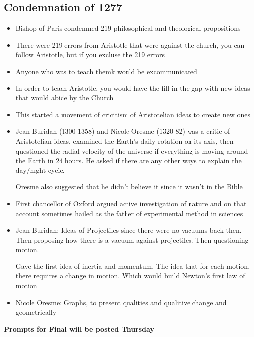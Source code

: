 \documentclass{article}
\begin{document}
\subsection{Condemnation of 1277}
\begin{itemize}
  \item Bishop of Paris condemned 219 philosophical and theological propositions
  \item There were 219 errors from Aristotle that were against the church, you
    can follow Aristotle, but if you excluse the 219 errors
  \item Anyone who was to teach themk would be excommunicated
  \item In order to teach Aristotle, you would have the fill in the gap with
    new ideas that would abide by the Church
  \item This started a movement of cricitism of Aristotelian ideas to create new ones
  \item Jean Buridan (1300-1358) and Nicole Oresme (1320-82) was a critic of Aristotelian ideas, examined
    the Earth's daily rotation on its axis, then questioned the radial velocity of the universe
    if everything is moving around the Earth in 24 hours. He asked if there are any
    other ways to explain the day/night cycle.

    Oresme also suggested that he didn't believe it since it
    wasn't in the Bible
  \item First chancellor of Oxford argued active investigation of nature
    and on that account sometimes hailed as the father of experimental method in sciences
  \item Jean Buridan: Ideas of Projectiles since there were no vacuums back then.
    Then proposing how there is a vacuum against projectiles. Then questioning motion.

    Gave the first idea of inertia and momentum. The idea that for each motion,
    there requires a change in motion. Which would build Newton's first law of motion
  \item Nicole Oresme: Graphs, to present qualities and qualitive change and geometrically
\end{itemize}

\textbf{Prompts for Final will be posted Thursday}
\end{document}
